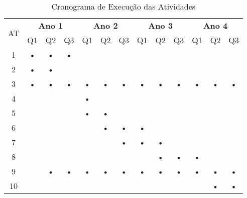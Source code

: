 \documentclass[12pt]{article}
\begin{document}
\begin{table}[htbp]
	\centering
		\begin{tabular}{|c|c|c|c|c|c|c|c|c|c|c|c|c|}
			\hline
			\multirow{2}{*}{AT} & \multicolumn{3}{c|}{\textbf{Ano 1}} & \multicolumn{3}{c|}{\textbf{Ano 2}} & \multicolumn{3}{c|}{\textbf{Ano 3}} & \multicolumn{3}{c|}{\textbf{Ano 4}} \\ \cline{2-13} 
													& Q1         & Q2         & Q3        & Q1         & Q2         & Q3        & Q1         & Q2         & Q3        & Q1         & Q2         & Q3        \\ \hline
			1                   & •          & •          & •         &            &            &           &            &            &           &            &            &           \\ \hline
			2                   & •          & •          &           &            &            &           &            &            &           &            &            &           \\ \hline
			3                   & •          & •          & •         & •          & •          & •         & •          & •          & •         & •          & •          & •         \\ \hline
			4                   &            &            &           & •          &            &           &            &            &           &            &            &           \\ \hline
			5                   &            &            &           & •          & •          &           &            &            &           &            &            &           \\ \hline
			6                   &            &            &           &            & •          & •         & •          &            &           &            &            &           \\ \hline
			7                   &            &            &           &            &            & •         & •          & •          &           &            &            &           \\ \hline
			8                   &            &            &           &            &            &           &            & •          & •         & •          &            &           \\ \hline
			9                   &            & •          & •         & •          & •          & •         & •          & •          & •         & •          & •          & •         \\ \hline
			10                  &            &            &           &            &            &           &            &            &           &            & •          & •         \\ \hline
		\end{tabular}
	\caption{Cronograma de Execução das Atividades}
	\label{tab:cronograma}
\end{table}


\end{document}
